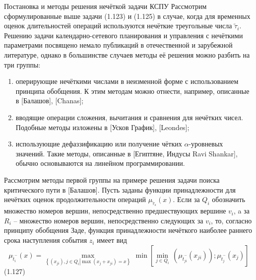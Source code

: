 Постановка и методы решения нечёткой задачи КСПУ
Рассмотрим сформулированные выше задачи (1.123) и (1.125) в случае, когда для временных оценок длительностей операций используются нечёткие треугольные числа ${{\tilde{\tau }}_{i}}$. Решению задачи календарно-сетевого планирования и управления с нечёткими параметрами посвящено немало публикаций в отечественной и зарубежной литературе, однако в большинстве случаев методы её решения можно разбить на три группы:
\begin{enumerate}
  \item оперирующие нечёткими числами в неизменной форме с использованием принципа обобщения. К этим методам можно отнести, например, описанные в [Балашов], [Chanas];
  \item вводящие операции сложения, вычитания и сравнения для нечётких чисел. Подобные методы изложены в [Усков График], [Leondes];
  \item использующие дефаззификацию или получение чётких $\alpha$-уровневых значений. Такие методы, описанные в [Египтяне, Индусы Ravi Shankar], обычно основываются на линейном программировании.
\end{enumerate}

Рассмотрим методы первой группы на примере решения задачи поиска критического пути в [Балашов]. Пусть заданы функции принадлежности для нечётких оценок продолжительности операций ${{\mu }_{{{{\tilde{\tau }}}_{s}}}}\left( x \right)$. Если за ${{Q}_{i}}$ обозначить множество номеров вершин, непосредственно предшествующих вершине ${{v}_{i}}$, a за ${{R}_{i}}$ – множество номеров вершин, непосредственно следующих за ${{v}_{i}}$, то, согласно принципу обобщения Заде, функция принадлежности нечёткого наиболее раннего срока наступления события ${{z}_{i}}$ имеет вид
	\[{{\mu }_{\tilde{t}_{i}^{-}}}\left( x \right)=\underset{\left\{ \left( {{x}_{ji}} \right),j\in {{Q}_{i}}\left| \max \left( {{x}_{j}}+{{x}_{ji}} \right)=x \right. \right\}}{\mathop{\max }}\,\min \left[ \underset{j\in {{Q}_{i}}}{\mathop{\min }}\,\left( {{\mu }_{\tilde{t}_{ji}^{-}}}\left( {{x}_{ji}} \right) \right);{{\mu }_{\tilde{t}_{j}^{-}}}\left( {{x}_{j}} \right) \right]\] 	(1.127)

